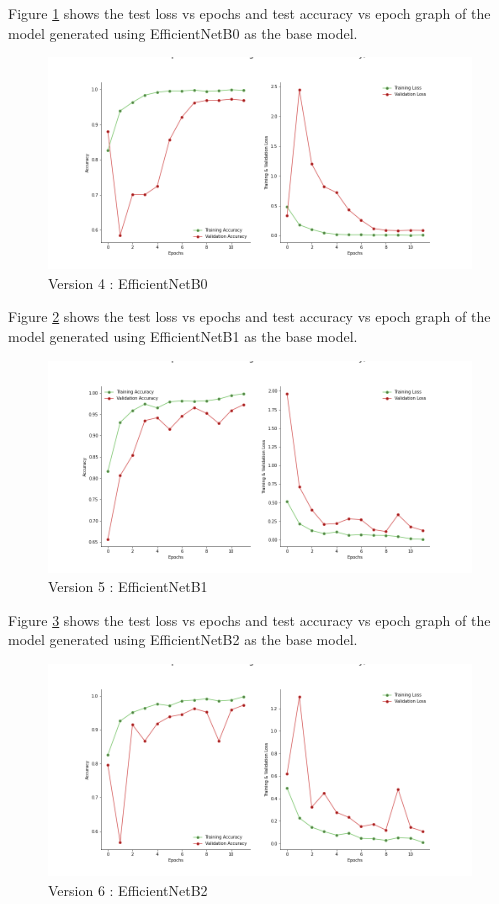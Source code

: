 Figure \ref{fig:effnetb0} shows the test loss vs epochs and test accuracy vs epoch graph of the model generated using EfficientNetB0 as the base model.
\begin{figure}[H]
\includegraphics[scale=0.29]{Photos/EfficientNetB0_plot.png}
\caption{Version 4 : EfficientNetB0} \label{fig:effnetb0}
\end{figure}
Figure \ref{fig:effnetb1} shows the test loss vs epochs and test accuracy vs epoch graph of the model generated using EfficientNetB1 as the base model.
\begin{figure}[H]
\includegraphics[scale=0.29]{Photos/EfficientNetB1_plot.png}
\caption{Version 5 : EfficientNetB1} \label{fig:effnetb1}
\end{figure}
Figure \ref{fig:effnetb2} shows the test loss vs epochs and test accuracy vs epoch graph of the model generated using EfficientNetB2 as the base model.
\begin{figure}[H]
\includegraphics[scale=0.29]{Photos/EfficientNetB2_plot.png}
\caption{Version 6 : EfficientNetB2} \label{fig:effnetb2}
\end{figure}
